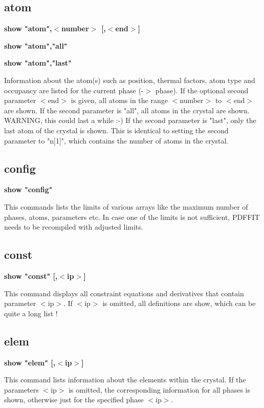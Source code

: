 \subsection*{atom}
{\bf show "atom",$ <$number$> $ [,$ <$end$> $] \par }
{\bf show "atom","all" \par }
{\bf show "atom","last" \par }
\par
\vspace{3pt}
Information about the atom(s) such as position, thermal factors, 
atom type and occupancy are listed for the current phase (-$> $ phase). 
If the optional second parameter $ <$end$> $ is given, all atoms in the 
range $ <$number$> $ to $ <$end$> $ are shown.  If the second parameter is "all", 
all atoms in the crystal are shown.  WARNING, this could last a while 
:-) If the second parameter is "last", only the last atom of the 
crystal is shown. This is identical to setting the second parameter 
to "n[1]", which contains the number of atoms in the crystal. 
\subsection*{config}
{\bf show "config" \par }
\par
\vspace{3pt}
This commands lists the limits of various arrays like the maximum 
number of phases, atoms, parameters etc. In case one of the limits 
is not sufficient, PDFFIT needs to be recompiled with adjusted 
limits. 
\subsection*{const}
{\bf show "const" [,$ <$ip$> $] \par }
\par
\vspace{3pt}
This command displays all constraint equations and derivatives 
that contain parameter $ <$ip$> $. If $ <$ip$> $ is omitted, all definitions 
are show, which can be quite a long list ! 
\subsection*{elem}
{\bf show "elem" [,$ <$ip$> $] \par }
\par
\vspace{3pt}
This command lists information about the elements within the 
crystal. If the parameters $ <$ip$> $ is omitted, the corresponding 
information for all phases is shown, otherwise just for the 
specified phase $ <$ip$> $. 
